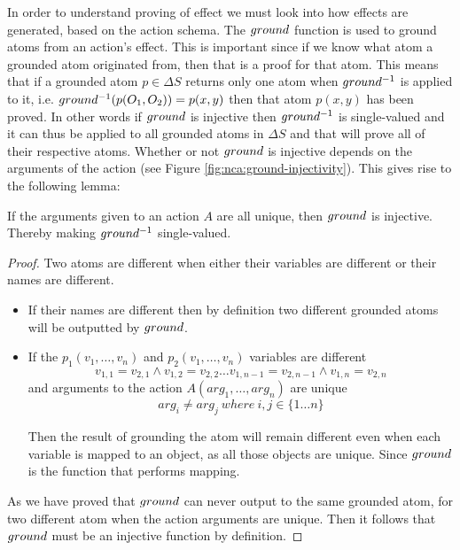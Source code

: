\documentclass[../Master.tex]{subfiles}
\begin{document}
In order to understand proving of effect we must look into how effects are generated, based on the action schema.
The $ground$ function is used to ground atoms from an action's effect. This is important since if we know what atom a grounded atom originated from, then that is a proof for that atom. This means that if a grounded atom $p \in \Delta S$ returns only one atom when $ground ^{-1} $ is applied to it, i.e. $ground ^{-1} (p(O_1,O_2)) = {p(x,y)}$ then that atom $p(x,y)$ has been proved. In other words if $ground$ is injective then $ground ^{-1} $ is single-valued and it can thus be applied to all grounded atoms in $\Delta S$ and that will prove all of their respective atoms.
Whether or not $ground$ is injective depends on the arguments of the action (see Figure \ref*{fig:nca:ground-injectivity}).
This gives rise to the following lemma:
\begin{lemma}
If the arguments given to an action $A$ are all unique, then $ground$ is injective. Thereby making $ground ^{-1} $ single-valued.

\begin{proof}
	Two atoms are different when either their variables are different or their names are different. 
	\begin{itemize}
		\item If their names are different then by definition two different grounded atoms will be outputted by $ground$.
		
		\item If the $p_1(v_1,\dots,v_n)$ and  $p_2(v_1,\dots,v_n)$ variables are different
			\begin{equation*}
				v_{1,1} = v_{2,1} \land 
				v_{1,2} = v_{2,2} \dots
				v_{1,n-1} = v_{2,n-1} \land
				v_{1,n} = v_{2,n}
			\end{equation*} 		
		and arguments to the action $A(arg_1,\dots,arg_n)$ are unique
			\begin{equation*}
			arg_i \neq arg_j ~ where~ i,j \in \{ 1 \dots n \}
			\end{equation*} 
		 
		Then the result of grounding the atom will remain different even when each variable is mapped to an object, 
		as all those objects are unique. 
		Since $ground$ is the function that performs mapping.
	\end{itemize}	
	As we have proved that $ground$ can never output to the same grounded atom, for two different atom when the action arguments are unique. Then it follows that $ground$ must be an injective function by definition. 
\end{proof}
\end{lemma}
\end{document}
